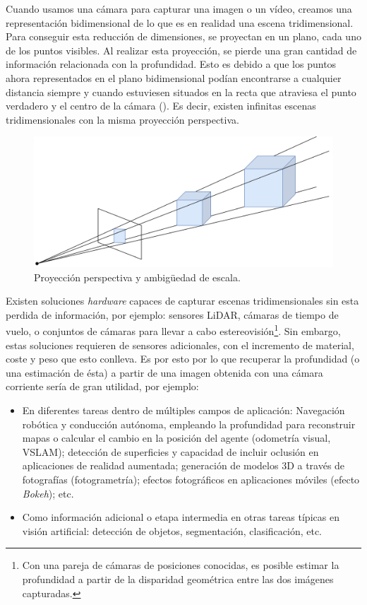 
Cuando usamos una cámara para capturar una imagen o un vídeo, creamos una representación bidimensional de lo que es en realidad una escena tridimensional. Para conseguir esta reducción de dimensiones, se proyectan en un plano, cada uno de los puntos visibles. Al realizar esta proyección, se pierde una gran cantidad de información relacionada con la profundidad. Esto es debido a que los puntos ahora representados en el plano bidimensional podían encontrarse a cualquier distancia siempre y cuando estuviesen situados en la recta que atraviesa el punto verdadero y el centro de la cámara (). Es decir, existen infinitas escenas tridimensionales con la misma proyección perspectiva.

\begin{figure}[H]
\centering
\includegraphics[width=0.65\linewidth]{imagenes/proyeccion-perspectiva.png} 
\captionsetup{width=.8\linewidth}
\caption{Proyección perspectiva y ambigüedad de escala.}
\label{fig:proyeccion-perspectiva}
\end{figure}

Existen soluciones \textit{hardware} capaces de capturar escenas tridimensionales sin esta perdida de información, por ejemplo: sensores LiDAR, cámaras de tiempo de vuelo, o conjuntos de cámaras para llevar a cabo estereovisión\footnote{Con una pareja de cámaras de posiciones conocidas, es posible estimar la profundidad a partir de la disparidad geométrica entre las dos imágenes capturadas.}\cite{hartley_zisserman_2004}. Sin embargo, estas soluciones requieren de sensores adicionales, con el incremento de material, coste y peso que esto conlleva. Es por esto por lo que recuperar la profundidad (o una estimación de ésta) a partir de una imagen obtenida con una cámara corriente sería de gran utilidad, por ejemplo:

\begin{itemize}
    \item En diferentes tareas dentro de múltiples campos de aplicación: Navegación robótica y conducción autónoma, empleando la profundidad para reconstruir mapas o calcular el cambio en la posición del agente (odometría visual, VSLAM); detección de superficies y capacidad de incluir oclusión en aplicaciones de realidad aumentada; generación de modelos 3D a través de fotografías (fotogrametría); efectos fotográficos en aplicaciones móviles (efecto \textit{Bokeh}); etc.
    \item Como información adicional o etapa intermedia en otras tareas típicas en visión artificial: detección de objetos, segmentación, clasificación, etc.
\end{itemize}

